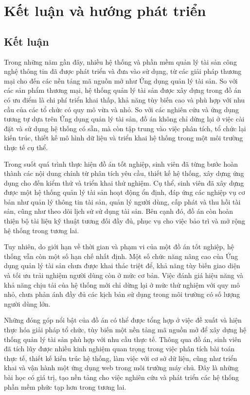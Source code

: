 \documentclass[../DoAn.tex]{subfiles}
\begin{document}
\section{Kết luận và hướng phát triển}
\subsection{Kết luận}
Trong những năm gần đây, nhiều hệ thống và phần mềm quản lý tài sản công nghệ thông tin đã được phát triển và đưa vào sử dụng, từ các giải pháp thương mại cho đến các nền tảng mã nguồn mở như Ứng dụng quản lý tài sản. So với các sản phẩm thương mại, hệ thống quản lý tài sản được xây dựng trong đồ án có ưu điểm là chi phí triển khai thấp, khả năng tùy biến cao và phù hợp với nhu cầu của các tổ chức có quy mô vừa và nhỏ. So với các nghiên cứu và ứng dụng tương tự dựa trên Ứng dụng quản lý tài sản, đồ án không chỉ dừng lại ở việc cài đặt và sử dụng hệ thống có sẵn, mà còn tập trung vào việc phân tích, tổ chức lại kiến trúc, thiết kế mô hình dữ liệu và triển khai hệ thống trong một môi trường thực tế cụ thể.

Trong suốt quá trình thực hiện đồ án tốt nghiệp, sinh viên đã từng bước hoàn thành các nội dung chính từ phân tích yêu cầu, thiết kế hệ thống, xây dựng ứng dụng cho đến kiểm thử và triển khai thử nghiệm. Cụ thể, sinh viên đã xây dựng được một hệ thống quản lý tài sản hoạt động ổn định, đáp ứng các nghiệp vụ cơ bản như quản lý thông tin tài sản, quản lý người dùng, cấp phát và thu hồi tài sản, cũng như theo dõi lịch sử sử dụng tài sản. Bên cạnh đó, đồ án còn hoàn thiện bộ tài liệu kỹ thuật tương đối đầy đủ, phục vụ cho việc bảo trì và mở rộng hệ thống trong tương lai.

Tuy nhiên, do giới hạn về thời gian và phạm vi của một đồ án tốt nghiệp, hệ thống vẫn còn một số hạn chế nhất định. Một số chức năng nâng cao của Ứng dụng quản lý tài sản chưa được khai thác triệt để, khả năng tùy biến giao diện và tối ưu trải nghiệm người dùng còn ở mức cơ bản. Việc đánh giá hiệu năng và khả năng chịu tải của hệ thống mới chỉ dừng lại ở mức thử nghiệm với quy mô nhỏ, chưa phản ánh đầy đủ các kịch bản sử dụng trong môi trường có số lượng người dùng lớn.

Những đóng góp nổi bật của đồ án có thể được tổng hợp ở việc đề xuất và hiện thực hóa giải pháp tổ chức, tùy biến một nền tảng mã nguồn mở để xây dựng hệ thống quản lý tài sản phù hợp với nhu cầu thực tế. Thông qua đồ án, sinh viên đã tích lũy được nhiều kinh nghiệm quan trọng trong việc phân tích bài toán thực tế, thiết kế kiến trúc hệ thống, làm việc với cơ sở dữ liệu, cũng như triển khai và vận hành một ứng dụng web trong môi trường máy chủ. Đây là những bài học có giá trị, tạo nền tảng cho việc nghiên cứu và phát triển các hệ thống phần mềm phức tạp hơn trong tương lai.
\end{document}
